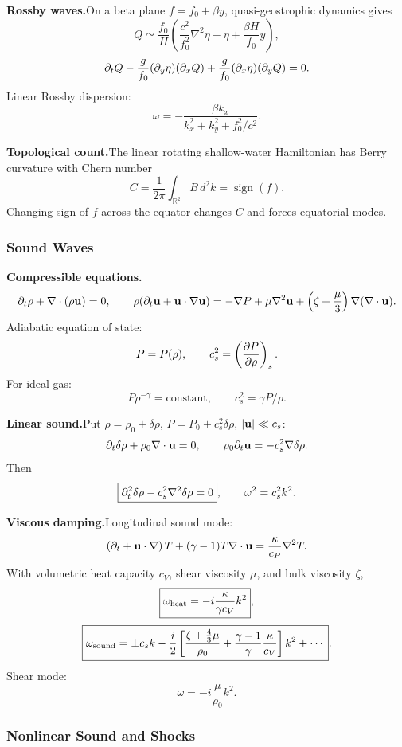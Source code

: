 \noindent\textbf{Rossby waves.}\quad On a beta plane $f=f_0+\beta y$, quasi-geostrophic dynamics gives
\[
  Q\simeq\frac{f_0}{H}\left(\frac{c^2}{f_0^2}\nabla^2\eta-\eta+\frac{\beta H}{f_0}y\right),
\]
\[
  \partial_tQ-\frac{g}{f_0}(\partial_y\eta)(\partial_xQ)
  +\frac{g}{f_0}(\partial_x\eta)(\partial_yQ)=0.
\]
Linear Rossby dispersion:
\[
  \boxed{\omega=-\frac{\beta k_x}{k_x^2+k_y^2+f_0^2/c^2}}.
\]

\noindent\textbf{Topological count.}\quad The linear rotating shallow-water Hamiltonian has Berry curvature with Chern number
\[
  \boxed{C=\frac{1}{2\pi}\int_{\mathbb R^2}B\,d^2k=\operatorname{sign}(f)}.
\]
Changing sign of $f$ across the equator changes $C$ and forces equatorial modes.

\subsubsection*{Sound Waves}

\noindent\textbf{Compressible equations.}\quad
\[
  \partial_t\rho+\nabla\cdot(\rho\mathbf{u})=0,
  \qquad
  \rho(\partial_t\mathbf{u}+\mathbf{u}\cdot\nabla\mathbf{u})=-\nabla P+\mu\nabla^2\mathbf{u}
  +\left(\zeta+\frac{\mu}{3}\right)\nabla(\nabla\cdot\mathbf{u}).
\]
Adiabatic equation of state:
\[
  P=P(\rho),\qquad c_s^2=\left(\frac{\partial P}{\partial\rho}\right)_s.
\]
For ideal gas:
\[
  P\rho^{-\gamma}=\text{constant},
  \qquad
  c_s^2=\gamma P/\rho.
\]

\noindent\textbf{Linear sound.}\quad Put $\rho=\rho_0+\delta\rho$, $P=P_0+c_s^2\delta\rho$, $|\mathbf{u}|\ll c_s$:
\[
  \partial_t\delta\rho+\rho_0\nabla\cdot\mathbf{u}=0,
  \qquad
  \rho_0\partial_t\mathbf{u}=-c_s^2\nabla\delta\rho.
\]
Then
\[
  \boxed{\partial_t^2\delta\rho-c_s^2\nabla^2\delta\rho=0},
  \qquad
  \omega^2=c_s^2k^2.
\]

\noindent\textbf{Viscous damping.}\quad Longitudinal sound mode:
\[
  \left(\partial_t+\mathbf{u}\cdot\nabla\right)T+(\gamma-1)T\nabla\cdot\mathbf{u}
  =\frac{\kappa}{c_P}\nabla^2T.
\]
With volumetric heat capacity $c_V$, shear viscosity $\mu$, and bulk viscosity $\zeta$,
\[
  \boxed{\omega_{\rm heat}=-i\frac{\kappa}{\gamma c_V}k^2},
\]
\[
  \boxed{\omega_{\rm sound}=\pm c_sk-\frac{i}{2}
  \left[\frac{\zeta+\frac43\mu}{\rho_0}
  +\frac{\gamma-1}{\gamma}\frac{\kappa}{c_V}\right]k^2+\cdots}.
\]
Shear mode:
\[
  \boxed{\omega=-i\frac{\mu}{\rho_0}k^2}.
\]

\subsubsection*{Nonlinear Sound and Shocks}

